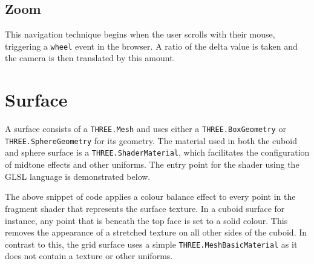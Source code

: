 {{		
	
	}

	\subsection{Zoom} {
	\label{sec:zoom}

		This navigation technique begins when the user scrolls with their mouse, triggering a \texttt{wheel} event in the browser. A ratio of the delta value is taken and the camera is then translated by this amount.
	
	}

}

\section{Surface} {
\label{sec:surface}

	\begin{sloppypar}
		A surface consists of a \texttt{THREE.Mesh} and uses either a \texttt{THREE.BoxGeometry} or \texttt{THREE.SphereGeometry} for its geometry. The material used in both the cuboid and sphere surface is a \texttt{THREE.ShaderMaterial}, which facilitates the configuration of midtone effects and other uniforms. The entry point for the shader using the GLSL language is demonstrated below.
	\end{sloppypar}

	

	The above snippet of code applies a colour balance effect to every point in the fragment shader that represents the surface texture. In a cuboid surface for instance, any point that is beneath the top face is set to a solid colour. This removes the appearance of a stretched texture on all other sides of the cuboid. In contrast to this, the grid surface uses a simple \texttt{THREE.MeshBasicMaterial} as it does not contain a texture or other uniforms.

}

